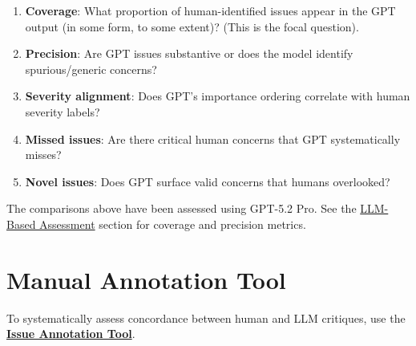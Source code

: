 \documentclass[
  11pt,
  letterpaper,
  DIV=11,
  numbers=noendperiod]{scrreprt}
\providecommand{\tightlist}{%
  \setlength{\itemsep}{0pt}\setlength{\parskip}{0pt}}
\begin{document}
\begin{enumerate}
\def\labelenumi{\arabic{enumi}.}
\tightlist
\item
  \textbf{Coverage}: What proportion of human-identified issues appear
  in the GPT output (in some form, to some extent)? (This is the focal
  question).
\item
  \textbf{Precision}: Are GPT issues substantive or does the model
  identify spurious/generic concerns?
\item
  \textbf{Severity alignment}: Does GPT's importance ordering correlate
  with human severity labels?
\item
  \textbf{Missed issues}: Are there critical human concerns that GPT
  systematically misses?
\item
  \textbf{Novel issues}: Does GPT surface valid concerns that humans
  overlooked?
\end{enumerate}

\begin{tcolorbox}[enhanced jigsaw, colback=white, title=\textcolor{quarto-callout-tip-color}{\faLightbulb}\hspace{0.5em}{LLM Assessment Complete}, bottomrule=.15mm, coltitle=black, left=2mm, colframe=quarto-callout-tip-color-frame, toptitle=1mm, toprule=.15mm, titlerule=0mm, breakable, leftrule=.75mm, colbacktitle=quarto-callout-tip-color!10!white, bottomtitle=1mm, arc=.35mm, rightrule=.15mm, opacityback=0, opacitybacktitle=0.6]

The comparisons above have been assessed using GPT-5.2 Pro. See the
\hyperref[sec-llm-assessment]{LLM-Based Assessment} section for coverage
and precision metrics.

\end{tcolorbox}

\section{Manual Annotation Tool}\label{manual-annotation-tool}

To systematically assess concordance between human and LLM critiques,
use the \href{tools/issue_annotation_ui/index.html}{\textbf{Issue
Annotation Tool}}.
\end{document}
